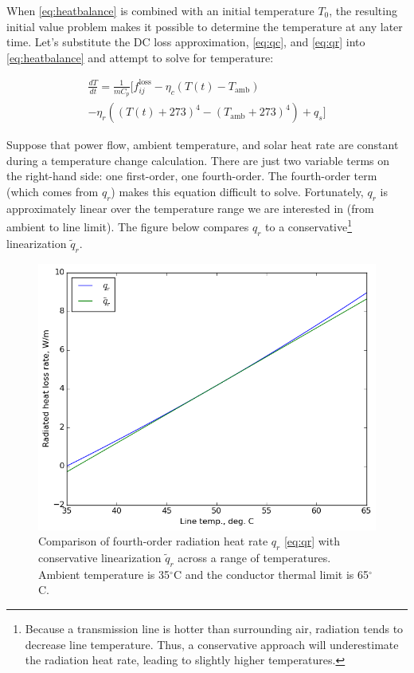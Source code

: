 \documentclass[conference]{IEEEtran}
\begin{document}
When \eqref{eq:heatbalance} is combined with an initial temperature $T_0$, the resulting initial value problem makes it possible to determine the temperature at any later time. Let's substitute the DC loss approximation, \eqref{eq:qc}, and \eqref{eq:qr} into \eqref{eq:heatbalance} and attempt to solve for temperature:

\begin{multline}
\frac{dT}{dt} = \frac{1}{mC_p}\big[ f_{ij}^\text{loss} - \eta_c\left( T(t) - T_\text{amb}\right) \\ - \eta_r\left((T(t) + 273)^4 - (T_\text{amb} + 273)^4\right) + q_s \big]
\end{multline}

Suppose that power flow, ambient temperature, and solar heat rate are constant during a temperature change calculation. There are just two variable terms on the right-hand side: one first-order, one fourth-order. The fourth-order term (which comes from $q_r$) makes this equation difficult to solve. Fortunately, $q_r$ is approximately linear over the temperature range we are interested in (from ambient to line limit). The figure below compares $q_r$ to a conservative\footnote{Because a transmission line is hotter than surrounding air, radiation tends to decrease line temperature. Thus, a conservative approach will underestimate the radiation heat rate, leading to slightly higher temperatures.} linearization $\tilde{q}_r$.

\begin{figure}[h]
\centering
\includegraphics[width=0.9\linewidth]{../images/rad_approx}
\caption{Comparison of fourth-order radiation heat rate $q_r$ \eqref{eq:qr} with conservative linearization $\tilde{q}_r$ across a range of temperatures. Ambient temperature is 35$^\circ$C and the conductor thermal limit is 65$^\circ$C.}
\label{fig:rad_approx}
\end{figure}
\end{document}
